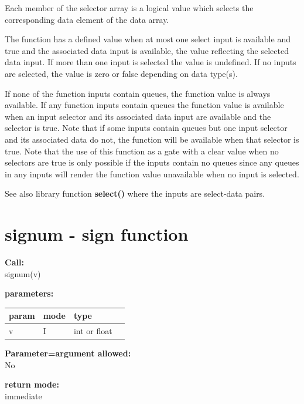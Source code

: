         Each member of the selector array is a logical value which selects
        the corresponding data element of the data array.
        
        The function has a defined value when at most one select input
        is available and true and the associated data input is available,
        the value reflecting the selected data input. If more than one
        input is selected the value is undefined. If no inputs are
        selected, the value is zero or false depending on data type(s).
        
        If none of the function inputs contain queues, the function value is
        always available. If any function inputs contain queues the function
        value is available when an input selector and its associated data
        input are available and the selector is true. Note that if some
        inputs contain queues but one input selector and its associated data
        do not, the function will be available when that selector is true.
        Note that the use of this function as a gate with a clear value
        when no selectors are true is only possible if the inputs contain
        no queues since any queues in any inputs will render the function
        value unavailable when no input is selected.
        
            
        See also library function {\bf select()} 
        where the inputs are select-data pairs.



    \section{signum - sign function}\label{sec:ifsignum}
        
        
        {\bf Call:} \\
        signum(v)
        
        {\bf parameters:} \\
        \begin{tabular}{| l | l | l | l |}
        \hline
        param  & mode & type & \\
        \hline \hline
        v & I & int or float & \\ \hline
        \end{tabular}
        
        {\bf Parameter=argument allowed:} \\
        No
        
        {\bf return mode:} \\
        immediate

